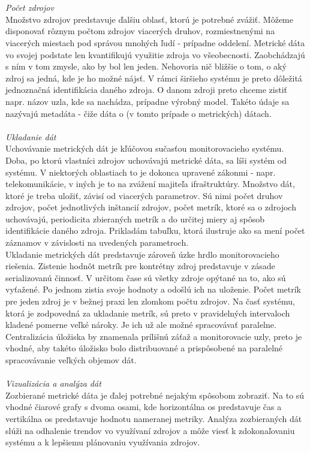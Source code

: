 \documentclass[11pt,final,oneside]{fithesis}
\begin{document}
\\
\\ \emph{Počet zdrojov}
\\
Množstvo zdrojov predstavuje ďalšiu oblasť, ktorú je potrebné zvážiť. Môžeme disponovať rôznym počtom zdrojov viacerých druhov, rozmiestnenými na viacerých miestach pod správou mnohých ľudí - prípadne oddelení. Metrické dáta vo svojej
podstate len kvantifikujú využitie zdroja vo všeobecnosti. Zaobchádzajú s ním v tom zmysle, ako by bol len jeden. Nehovoria nič bližšie o tom, o aký zdroj sa jedná, kde je ho možné nájsť. V rámci širšieho
systému je preto dôležitá jednoznačná identifikácia daného zdroja. O danom zdroji preto chceme zistiť napr. názov uzla, kde sa nachádza, prípadne výrobný model. Takéto údaje sa nazývajú metadáta - čiže dáta o (v tomto 
prípade o metrických) dátach.
\\
\\ \emph{Ukladanie dát}
\\
Uchovávanie metrických dát je kľúčovou sučasťou monitorovacieho systému. Doba, po ktorú vlastníci zdrojov uchovávajú metrické dáta, sa líši systém od systému. V niektorých oblastiach to je dokonca upravené zákonmi - napr. telekomunikácie,
v iných je to na zvážení majiteľa ifraštruktúry. Množstvo dát, ktoré je treba uložiť, závisí od viacerých parametrov. Sú nimi počet druhov zdrojov, počet jednotlivých inštancií zdrojov, počet metrík, ktoré sa o zdrojoch
uchovávajú, periodicita zbieraných metrík a do určitej miery aj spôsob identifikácie daného zdroja. Prikladám tabuľku, ktorá ilustruje ako sa mení počet záznamov v závislosti na uvedených parametroch.
\\Ukladanie metrických dát predstavuje zároveň úzke hrdlo monitorovacieho riešenia. Zistenie hodnôt metrík pre kontrétny zdroj predstavuje v zásade serializovanú činnosť. V určitom čase sú všetky zdroje opýtané na to, ako sú vyťažené. Po jednom
zistia svoje hodnoty a odošlú ich na uloženie. Počet metrík pre jeden zdroj je v bežnej praxi len zlomkom počtu zdrojov. Na časť systému, ktorá je zodpovedná za ukladanie metrík, sú preto v pravidelných intervaloch kladené pomerne 
veľké nároky. Je ich už ale možné spracovávať paralelne. Centralizácia úložiska by znamenala prílišnú záťaž a monitorovacie uzly, preto je vhodné, aby takéto úložisko bolo distribuované a prispôsobené na paralelné spracovávanie veľkých
objemov dát.
\\
\\ \emph{Vizualizácia a analýza dát}
\\
Zozbierané metrické dáta je ďalej potrebné nejakým spôsobom zobraziť. Na to sú vhodné čiarové grafy s dvoma osami, kde horizontálna os predstavuje čas a vertikálna os predstavuje hodnotu nameranej metriky.
Analýza zozbieraných dát slúži na odhalenie trendov vo využívaní zdrojov a môže viesť k zdokonaľovaniu systému a k lepšiemu plánovaniu využívania zdrojov.
\end{document}

